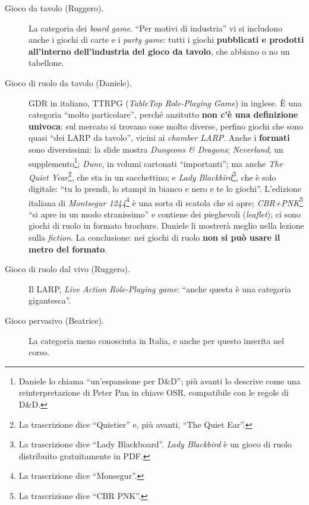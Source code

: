 \begin{description}
  \item[Gioco da tavolo (Ruggero).] La categoria dei \emph{board game}. ``Per
        motivi di industria'' vi si includono anche i giochi di carte e i
        \emph{party game}: tutti i giochi \textbf{pubblicati e prodotti
        all'interno dell'industria del gioco da tavolo}, che abbiano o no un
        tabellone.
  \item[Gioco di ruolo da tavolo (Daniele).] GDR in italiano, TTRPG
        (\emph{TableTop Role-Playing Game}) in inglese. È una categoria ``molto
        particolare'', perché anzitutto \textbf{non c'è una definizione
        univoca}: sul mercato si trovano cose molto diverse, perfino giochi che
        sono quasi ``dei LARP da tavolo'', vicini ai \emph{chamber LARP}. Anche
        i \textbf{formati} sono diversissimi: la slide mostra \emph{Dungeons \&
        Dragons}; \emph{Neverland}, un supplemento\footnote{Daniele lo chiama
        ``un'espansione per D\&D''; più avanti lo descrive come una
        reinterpretazione di Peter Pan in chiave OSR, compatibile con le regole
        di D\&D.}; \emph{Dune}, in volumi cartonati ``importanti''; ma anche
        \emph{The Quiet Year}\footnote{La trascrizione dice ``Quietier'' e, più
        avanti, ``The Quiet Ear''.}, che sta in un sacchettino; e \emph{Lady
        Blackbird}\footnote{La trascrizione dice ``Lady Blackboard''. \emph{Lady
        Blackbird} è un gioco di ruolo distribuito gratuitamente in PDF.}, che è
        solo digitale: ``tu lo prendi, lo stampi in bianco e nero e te lo
        giochi''. L'edizione italiana di \emph{Montsegur 1244}\footnote{La
        trascrizione dice ``Monsegur''.} è una sorta di scatola che si apre;
        \emph{CBR+PNK}\footnote{La trascrizione dice ``CBR PNK''.} ``si apre in
        un modo stranissimo'' e contiene dei pieghevoli (\emph{leaflet}); ci sono
        giochi di ruolo in formato brochure. Daniele li mostrerà meglio nella
        lezione sulla \emph{fiction}. La conclusione: nei giochi di ruolo
        \textbf{non si può usare il metro del formato}.
  \item[Gioco di ruolo dal vivo (Ruggero).] Il LARP, \emph{Live Action
        Role-Playing game}: ``anche questa è una categoria gigantesca''.
  \item[Gioco pervasivo (Beatrice).] La categoria meno conosciuta in Italia, e
        anche per questo inserita nel corso.
\end{description}

